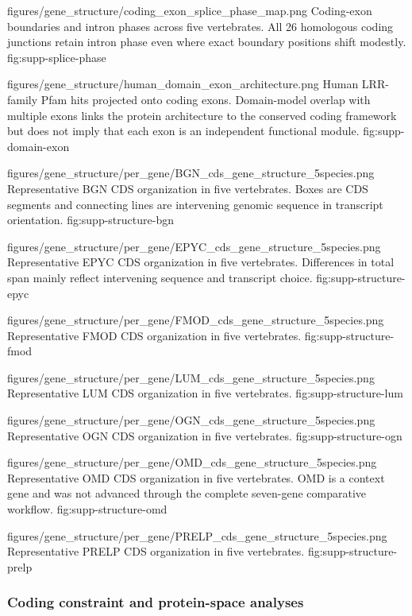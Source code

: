 \thesissuppfigure
{figures/gene_structure/coding_exon_splice_phase_map.png}
{Coding-exon boundaries and intron phases across five vertebrates. All 26
homologous coding junctions retain intron phase even where exact boundary
positions shift modestly.}
{fig:supp-splice-phase}

\thesissuppfigure
{figures/gene_structure/human_domain_exon_architecture.png}
{Human LRR-family Pfam hits projected onto coding exons. Domain-model overlap
with multiple exons links the protein architecture to the conserved coding
framework but does not imply that each exon is an independent functional
module.}
{fig:supp-domain-exon}

\thesissuppfigure
{figures/gene_structure/per_gene/BGN_cds_gene_structure_5species.png}
{Representative BGN CDS organization in five vertebrates. Boxes are CDS
segments and connecting lines are intervening genomic sequence in transcript
orientation.}
{fig:supp-structure-bgn}

\thesissuppfigure
{figures/gene_structure/per_gene/EPYC_cds_gene_structure_5species.png}
{Representative EPYC CDS organization in five vertebrates. Differences in
total span mainly reflect intervening sequence and transcript choice.}
{fig:supp-structure-epyc}

\thesissuppfigure
{figures/gene_structure/per_gene/FMOD_cds_gene_structure_5species.png}
{Representative FMOD CDS organization in five vertebrates.}
{fig:supp-structure-fmod}

\thesissuppfigure
{figures/gene_structure/per_gene/LUM_cds_gene_structure_5species.png}
{Representative LUM CDS organization in five vertebrates.}
{fig:supp-structure-lum}

\thesissuppfigure
{figures/gene_structure/per_gene/OGN_cds_gene_structure_5species.png}
{Representative OGN CDS organization in five vertebrates.}
{fig:supp-structure-ogn}

\thesissuppfigure
{figures/gene_structure/per_gene/OMD_cds_gene_structure_5species.png}
{Representative OMD CDS organization in five vertebrates. OMD is a context gene
and was not advanced through the complete seven-gene comparative workflow.}
{fig:supp-structure-omd}

\thesissuppfigure
{figures/gene_structure/per_gene/PRELP_cds_gene_structure_5species.png}
{Representative PRELP CDS organization in five vertebrates.}
{fig:supp-structure-prelp}

\clearpage
\subsubsection{Coding constraint and protein-space analyses}

